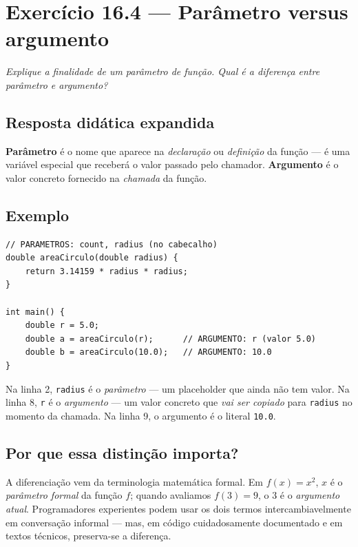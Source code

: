 \documentclass[11pt,a4paper]{article}
\begin{document}
\section{Exerc\'icio 16.4 --- Par\^ametro versus argumento}

\textit{Explique a finalidade de um par\^ametro de fun\c{c}\~ao. Qual \'e a diferen\c{c}a entre par\^ametro e argumento?}

\subsection*{Resposta did\'atica expandida}

\begin{resposta}
\textbf{Par\^ametro} \'e o nome que aparece na \emph{declara\c{c}\~ao} ou \emph{defini\c{c}\~ao} da fun\c{c}\~ao --- \'e uma vari\'avel especial que receber\'a o valor passado pelo chamador. \textbf{Argumento} \'e o valor concreto fornecido na \emph{chamada} da fun\c{c}\~ao.
\end{resposta}

\subsection*{Exemplo}

\begin{lstlisting}[style=cppcode]
// PARAMETROS: count, radius (no cabecalho)
double areaCirculo(double radius) {
    return 3.14159 * radius * radius;
}

int main() {
    double r = 5.0;
    double a = areaCirculo(r);      // ARGUMENTO: r (valor 5.0)
    double b = areaCirculo(10.0);   // ARGUMENTO: 10.0
}
\end{lstlisting}

\noindent Na linha 2, \texttt{radius} \'e o \emph{par\^ametro} --- um placeholder que ainda n\~ao tem valor. Na linha 8, \texttt{r} \'e o \emph{argumento} --- um valor concreto que \emph{vai ser copiado} para \texttt{radius} no momento da chamada. Na linha 9, o argumento \'e o literal \texttt{10.0}.

\subsection*{Por que essa distin\c{c}\~ao importa?}

A diferencia\c{c}\~ao vem da terminologia matem\'atica formal. Em $f(x) = x^2$, $x$ \'e o \emph{par\^ametro formal} da fun\c{c}\~ao $f$; quando avaliamos $f(3) = 9$, o $3$ \'e o \emph{argumento atual}. Programadores experientes podem usar os dois termos intercambiavelmente em conversa\c{c}\~ao informal --- mas, em c\'odigo cuidadosamente documentado e em textos t\'ecnicos, preserva-se a diferen\c{c}a.
\end{document}
